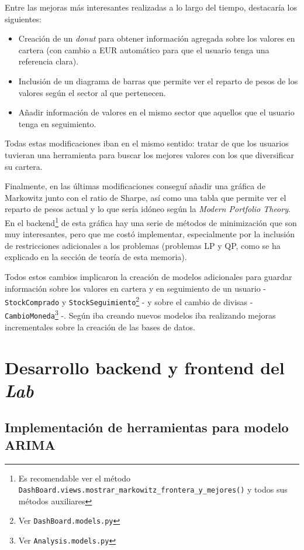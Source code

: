 Entre las mejoras más interesantes realizadas a lo largo del tiempo, destacaría los siguientes:

\begin{itemize}
\item
Creación de un \emph{donut} para obtener información agregada sobre los valores en cartera (con cambio a EUR automático para que el usuario tenga una referencia clara). 
\item
Inclusión de un diagrama de barras que permite ver el reparto de pesos de los valores según el sector al que pertenecen. 
\item
Añadir información de valores en el mismo sector que aquellos que el usuario tenga en seguimiento. 
\end{itemize}

Todas estas modificaciones iban en el mismo sentido: tratar de que los usuarios tuvieran una herramienta para buscar los mejores valores con los que diversificar su cartera. 

Finalmente, en las últimas modificaciones conseguí añadir una gráfica de Markowitz junto con el ratio de Sharpe, así como una tabla que permite ver el reparto de pesos actual y lo que sería idóneo según la \emph{Modern Portfolio Theory}. En el backend\footnote{Es recomendable ver el método \texttt{DashBoard.views.mostrar\_markowitz\_frontera\_y\_mejores()} y todos sus métodos auxiliares} de esta gráfica hay una serie de métodos de minimización que son muy interesantes, pero que me costó implementar, especialmente por la inclusión de restricciones adicionales a los problemas (problemas LP y QP, como se ha explicado en la sección de teoría de esta memoria). 

Todos estos cambios implicaron la creación de modelos adicionales para guardar información sobre los valores en cartera y en seguimiento de un usuario - \texttt{StockComprado} y \texttt{StockSeguimiento}\footnote{Ver \texttt{DashBoard.models.py}} - y sobre el cambio de divisas - \texttt{CambioMoneda}\footnote{Ver \texttt{Analysis.models.py}} -. Según iba creando nuevos modelos iba realizando mejoras incrementales sobre la creación de las bases de datos. 



\section{Desarrollo backend y frontend del \emph{Lab}}\label{desarrollo_lab}

\subsection{Implementación de herramientas para modelo ARIMA}


